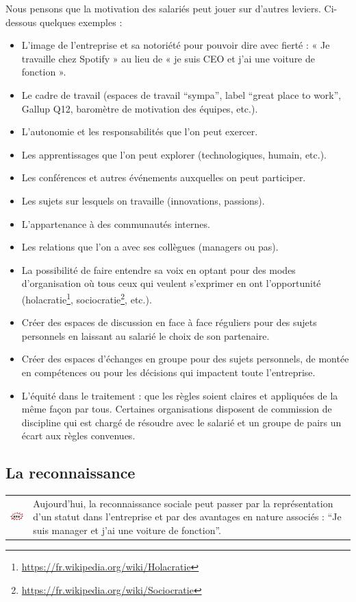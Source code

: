 \documentclass[12pt]{article}
\newcommand{\actuel}[1]{%
  \begin{tcolorbox}[colframe=DarkButter,boxrule=2pt,arc=4pt,left=6pt,right=6pt,top=6pt,bottom=6pt,boxsep=0pt,colback=Aluminium1]
    \begin{tabular}{m{1.5cm} m{11cm}}
      \includegraphics[width=1.5cm]{includes/now} & #1 \\
    \end{tabular}
  \end{tcolorbox}
}
\begin{document}
 Nous pensons que la motivation des salariés peut jouer sur d’autres leviers. Ci-dessous quelques exemples :
 \begin{itemize}
   \item L’image de l’entreprise et sa notoriété pour pouvoir dire avec fierté : « Je travaille chez Spotify » au lieu de « je suis CEO et j’ai une voiture de fonction ».
   \item Le cadre de travail (espaces de travail “sympa”, label “great place to work”, Gallup Q12, baromètre de motivation des équipes, etc.).
   \item L’autonomie et les responsabilités que l’on peut exercer.
   \item Les apprentissages que l’on peut explorer (technologiques, humain, etc.).
   \item Les conférences et autres événements auxquelles on peut participer.
   \item Les sujets sur lesquels on travaille (innovations, passions).
   \item L’appartenance à des communautés internes.
   \item Les relations que l’on a avec ses collègues (managers ou pas).
   \item La possibilité de faire entendre sa voix en optant pour des modes d’organisation où tous ceux qui veulent s’exprimer en ont l’opportunité (holacratie\footnote{\url{https://fr.wikipedia.org/wiki/Holacratie}}, sociocratie\footnote{\url{https://fr.wikipedia.org/wiki/Sociocratie}}, etc.).
   \item Créer des espaces de discussion en face à face réguliers pour des sujets personnels en laissant au salarié le choix de son partenaire.
   \item Créer des espaces d’échanges en groupe pour des sujets personnels, de montée en compétences ou pour les décisions qui impactent toute l’entreprise.
   \item L’équité dans le traitement : que les règles soient claires et appliquées de la même façon par tous. Certaines organisations disposent de commission de discipline qui est chargé de résoudre avec le salarié et un groupe de pairs un écart aux règles convenues.
 \end{itemize}

\subsection{La reconnaissance}
 \actuel{Aujourd’hui, la reconnaissance sociale peut passer par la représentation d’un statut dans l’entreprise et par des avantages en nature associés : “Je suis manager et j’ai une voiture de fonction”.}
\end{document}
